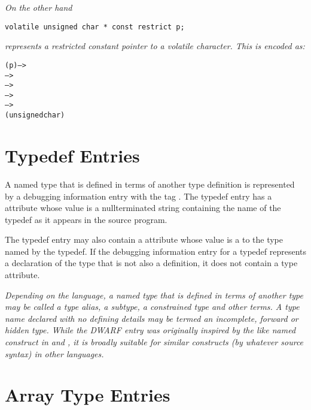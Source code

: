 \textit{On the other hand}
\begin{lstlisting}[numbers=none]                        
   volatile unsigned char * const restrict p;
\end{lstlisting}
\textit{represents a restricted constant
pointer to a volatile character. This is encoded as:}

\begin{dwflisting}
\begin{alltt}
        \DWTAGvariable(p) -->
            \DWTAGrestricttype -->
                \DWTAGconsttype -->
                    \DWTAGpointertype -->
                        \DWTAGvolatiletype -->
                            \DWTAGbasetype(unsigned char)
\end{alltt}
\end{dwflisting}

\section{Typedef Entries}
\label{chap:typedefentries}
A named type that is defined in terms of another type
definition is represented by a debugging information entry with
the tag \DWTAGtypedefTARG. 
The typedef entry has a \DWATname{} attribute 
whose value is a null\dash terminated string containing
the name of the typedef as it appears in the source program.

The typedef entry may also contain 
a 
\DWATtype{} attribute whose
value is a  
to the type named by the typedef. If
the debugging information entry for a typedef represents
a declaration of the type that is not also a definition,
it does not contain a type attribute.

\textit{Depending on the language, a named type that is defined in
terms of another type may be called a type alias, a subtype,
a constrained type and other terms. A type name declared with
no defining details may be termed an 
incomplete, forward or hidden type. 
While the DWARF \DWTAGtypedef{} entry was
originally inspired by the like named construct in 
 and ,
it is broadly suitable for similar constructs (by whatever
source syntax) in other languages.}

\section{Array Type Entries}
\label{chap:arraytypeentries}
\label{chap:DWTAGgenericsubrange}

